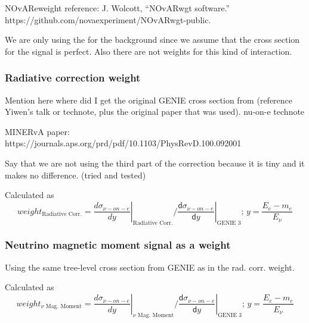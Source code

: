 NOvAReweight reference: J. Wolcott, “NOvARwgt software.” https://github.com/novaexperiment/NOvARwgt-public.


We are only using the for the background since we assume that the cross section for the signal is perfect. Also there are not weights for this kind of interaction.

\subsubsection*{Radiative correction weight}

Mention here where did I get the original GENIE cross section from (reference Yiwen's talk or technote, plus the original paper that was used). nu-on-e technote\cite{NOVA-doc-56383}


MINERvA paper:
https://journals.aps.org/prd/pdf/10.1103/PhysRevD.100.092001

Say that we are not using the third part of the correction because it is tiny and it makes no difference. (tried and tested)

Calculated as 
\begin{equation}
weight_{\text{Radiative Corr.}} = \left.\frac{d\sigma_{\nu-on-e}}{dy}\right|_{\text{Radiative Corr.}} / \left.\frac{\textsf{d}\sigma_{\nu-on-e}}{\textsf{d}y}\right|_{\text{GENIE 3}};\,y=\frac{E_e-m_e}{E_\nu}
\end{equation}

\subsubsection{Neutrino magnetic moment signal as a weight}

Using the same tree-level cross section from GENIE as in the rad. corr. weight.


Calculated as 
\begin{equation}
weight_{\nu\text{ Mag. Moment}} = \left.\frac{d\sigma_{\nu-on-e}}{dy}\right|_{\nu\text{ Mag. Moment}} / \left.\frac{\textsf{d}\sigma_{\nu-on-e}}{\textsf{d}y}\right|_{\text{GENIE 3}};\,y=\frac{E_e-m_e}{E_\nu}
\end{equation}

